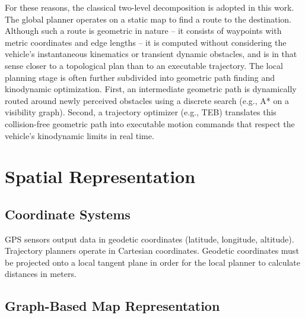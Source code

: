 For these reasons, the classical two-level decomposition is adopted in this work. The global planner operates on a static map to find a route to the destination. Although such a route is geometric in nature -- it consists of waypoints with metric coordinates and edge lengths -- it is computed without considering the vehicle's instantaneous kinematics or transient dynamic obstacles, and is in that sense closer to a topological plan than to an executable trajectory.
The local planning stage is often further subdivided into geometric path finding and kinodynamic optimization. First, an intermediate geometric path is dynamically routed around newly perceived obstacles using a discrete search (e.g., A* on a visibility graph). Second, a trajectory optimizer (e.g., TEB) translates this collision-free geometric path into executable motion commands that respect the vehicle's kinodynamic limits in real time.

\section{Spatial Representation}
\label{sec:spatial-representation}

\subsection{Coordinate Systems}
\label{subsec:coordinate-systems}

GPS sensors output data in geodetic coordinates (latitude, longitude, altitude). Trajectory planners operate in Cartesian coordinates. Geodetic coordinates must be projected onto a local tangent plane in order for the local planner to calculate distances in meters.

\subsection{Graph-Based Map Representation}
\label{subsec:graph-map}

